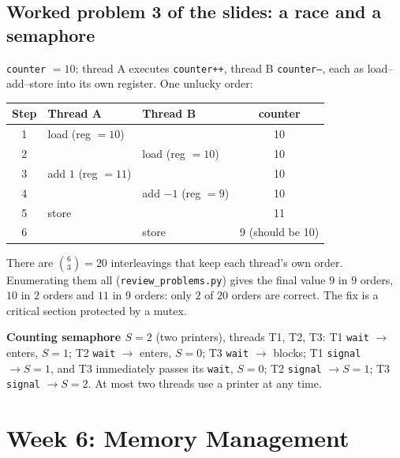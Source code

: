 \documentclass[11pt,a4paper]{article}
\begin{document}
\subsection{Worked problem 3 of the slides: a race and a semaphore}
\texttt{counter} $= 10$; thread A executes \texttt{counter++}, thread B \texttt{counter--}, each as load--add--store into its own register. One unlucky order:
\begin{center}
\renewcommand{\arraystretch}{1.15}
\begin{tabular}{@{}cllc@{}}
\toprule
\textbf{Step} & \textbf{Thread A} & \textbf{Thread B} & \textbf{counter}\\
\midrule
1 & load (reg $=10$) & & 10\\
2 & & load (reg $=10$) & 10\\
3 & add $1$ (reg $=11$) & & 10\\
4 & & add $-1$ (reg $=9$) & 10\\
5 & store & & 11\\
6 & & store & 9 (should be 10)\\
\bottomrule
\end{tabular}
\end{center}
There are $\binom{6}{3} = 20$ interleavings that keep each thread's own order. Enumerating them all (\texttt{review\_problems.py}) gives the final value $9$ in $9$ orders, $10$ in $2$ orders and $11$ in $9$ orders: only $2$ of $20$ orders are correct. The fix is a critical section protected by a mutex.

\textbf{Counting semaphore $S = 2$} (two printers), threads T1, T2, T3: T1 \texttt{wait} $\to$ enters, $S=1$; T2 \texttt{wait} $\to$ enters, $S=0$; T3 \texttt{wait} $\to$ blocks; T1 \texttt{signal} $\to S=1$, and T3 immediately passes its \texttt{wait}, $S=0$; T2 \texttt{signal} $\to S=1$; T3 \texttt{signal} $\to S=2$. At most two threads use a printer at any time.

\section{Week 6: Memory Management}
\label{sec:w6}
\end{document}
